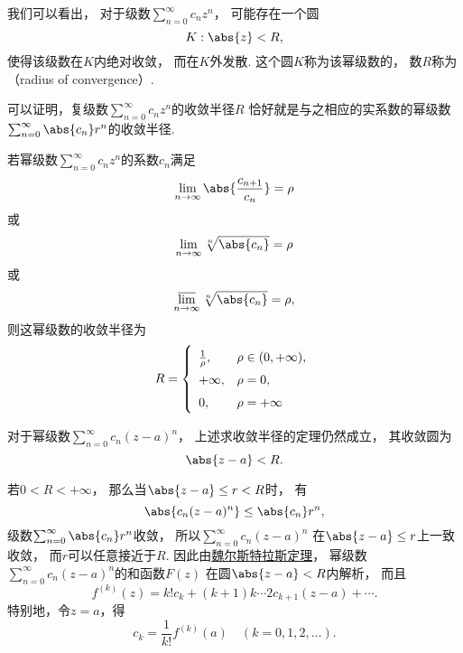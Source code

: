 我们可以看出，
对于级数\(\sum_{n=0}^\infty c_n z^n\)，
可能存在一个圆\begin{equation*}
	K: \abs{z} < R,
\end{equation*}使得该级数在\(K\)内绝对收敛，
而在\(K\)外发散.
这个圆\(K\)称为该幂级数的，
数\(R\)称为（radius of convergence）.

可以证明，复级数\(\sum_{n=0}^\infty c_n z^n\)的收敛半径\(R\)
恰好就是与之相应的实系数的幂级数\(\sum_{n=0}^\infty \abs{c_n} r^n\)的收敛半径.

\begin{theorem}\label{theorem:解析函数的级数表示.复幂级数的收敛半径的求法}
若幂级数\(\sum_{n=0}^\infty c_n z^n\)的系数\(c_n\)满足\begin{equation*}
	\lim_{n\to\infty} \abs{\frac{c_{n+1}}{c_n}} = \rho
\end{equation*}或\begin{equation*}
	\lim_{n\to\infty} \sqrt[n]{\abs{c_n}} = \rho
\end{equation*}或\begin{equation*}
	\varlimsup_{n\to\infty} \sqrt[n]{\abs{c_n}} = \rho,
\end{equation*}
则这幂级数的收敛半径为\begin{equation*}
	\def\arraystretch{1.5}
	R = \left\{ \begin{array}{ll}
		\frac{1}{\rho}, & \rho \in (0,+\infty), \\
		+\infty, & \rho = 0, \\
		0, & \rho = +\infty \\
	\end{array} \right.
\end{equation*}
\end{theorem}
对于幂级数\(\sum_{n=0}^\infty c_n (z-a)^n\)，
上述求收敛半径的定理仍然成立，
其收敛圆为\begin{equation*}
	\abs{z-a}<R.
\end{equation*}

若\(0<R<+\infty\)，
那么当\(\abs{z-a} \leq r < R\)时，
有\begin{equation*}
	\abs{c_n (z-a)^n} \leq \abs{c_n} r^n,
\end{equation*}
级数\(\sum_{n=0}^\infty \abs{c_n} r^n\)收敛，
所以\(\sum_{n=0}^\infty c_n (z-a)^n\)
在\(\abs{z-a} \leq r\)上一致收敛，
而\(r\)可以任意接近于\(R\).
因此由\hyperref[theorem:解析函数的级数表示.魏尔斯特拉斯定理]{魏尔斯特拉斯定理}，
幂级数\(\sum_{n=0}^\infty c_n (z-a)^n\)的和函数\(F(z)\)
在圆\(\abs{z-a}<R\)内解析，
而且\begin{equation*}
	f^{(k)}(z) = k! c_k + (k+1)k\dotsm2c_{k+1}(z-a)+\dotsb.
\end{equation*}
特别地，令\(z=a\)，得\begin{equation*}
	c_k = \frac{1}{k!} f^{(k)}(a)
	\quad(k=0,1,2,\dotsc).
\end{equation*}

